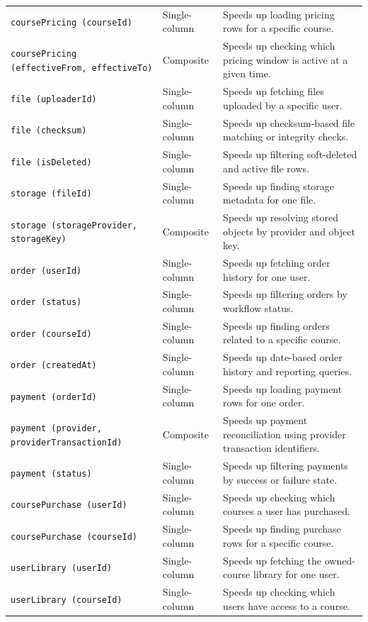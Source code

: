 \begin{longtable}{L{4.3cm}L{2.6cm}L{6.3cm}}
\texttt{coursePricing (courseId)} & Single-column & Speeds up loading pricing rows for a specific course. \\
\texttt{coursePricing (effectiveFrom, effectiveTo)} & Composite & Speeds up checking which pricing window is active at a given time. \\
\texttt{file (uploaderId)} & Single-column & Speeds up fetching files uploaded by a specific user. \\
\texttt{file (checksum)} & Single-column & Speeds up checksum-based file matching or integrity checks. \\
\texttt{file (isDeleted)} & Single-column & Speeds up filtering soft-deleted and active file rows. \\
\texttt{storage (fileId)} & Single-column & Speeds up finding storage metadata for one file. \\
\texttt{storage (storageProvider, storageKey)} & Composite & Speeds up resolving stored objects by provider and object key. \\
\texttt{order (userId)} & Single-column & Speeds up fetching order history for one user. \\
\texttt{order (status)} & Single-column & Speeds up filtering orders by workflow status. \\
\texttt{order (courseId)} & Single-column & Speeds up finding orders related to a specific course. \\
\texttt{order (createdAt)} & Single-column & Speeds up date-based order history and reporting queries. \\
\texttt{payment (orderId)} & Single-column & Speeds up loading payment rows for one order. \\
\texttt{payment (provider, providerTransactionId)} & Composite & Speeds up payment reconciliation using provider transaction identifiers. \\
\texttt{payment (status)} & Single-column & Speeds up filtering payments by success or failure state. \\
\texttt{coursePurchase (userId)} & Single-column & Speeds up checking which courses a user has purchased. \\
\texttt{coursePurchase (courseId)} & Single-column & Speeds up finding purchase rows for a specific course. \\
\texttt{userLibrary (userId)} & Single-column & Speeds up fetching the owned-course library for one user. \\
\texttt{userLibrary (courseId)} & Single-column & Speeds up checking which users have access to a course. \\

\end{longtable}
